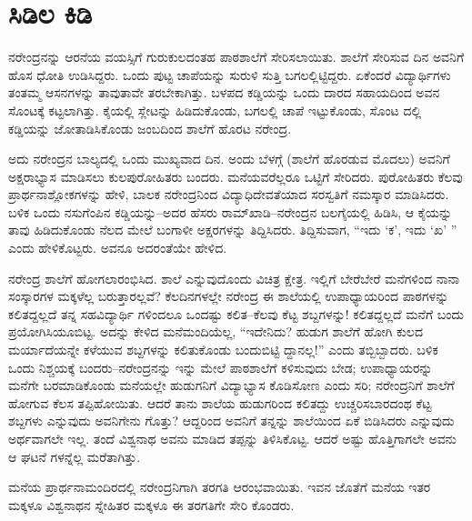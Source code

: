 
\chapter{ಸಿಡಿಲ ಕಿಡಿ}

\noindent

ನರೇಂದ್ರನನ್ನು ಆರನೆಯ ವಯಸ್ಸಿಗೆ ಗುರುಕುಲದಂತಹ ಪಾಠಶಾಲೆಗೆ ಸೇರಿಸಲಾಯಿತು. ಶಾಲೆಗೆ ಸೇರಿಸುವ ದಿನ ಅವನಿಗೆ ಹೊಸ ಧೋತಿ ಉಡಿಸಿದ್ದರು. ಒಂದು ಪುಟ್ಟ ಚಾಪೆಯನ್ನು ಸುರುಳಿ ಸುತ್ತಿ ಬಗಲಲ್ಲಿಟ್ಟಿದ್ದರು. ಏಕೆಂದರೆ ವಿದ್ಯಾರ್ಥಿಗಳು ತಂತಮ್ಮ ಆಸನಗಳನ್ನು ತಾವುತಾವೇ ತರಬೇಕಾಗಿತ್ತು. ಬಳಪದ ಕಡ್ಡಿಯನ್ನು ಒಂದು ದಾರದ ಸಹಾಯದಿಂದ ಅವನ ಸೊಂಟಕ್ಕೆ ಕಟ್ಟಲಾಗಿತ್ತು. ಕೈಯಲ್ಲಿ ಸ್ಲೇಟನ್ನು ಹಿಡಿದುಕೊಂಡು, ಬಗಲಲ್ಲಿ ಚಾಪೆ ಇಟ್ಟುಕೊಂಡು, ಸೊಂಟ ದಲ್ಲಿ ಕಡ್ಡಿಯನ್ನು ಜೋತಾಡಿಸಿಕೊಂಡು ಜಂಬದಿಂದ ಶಾಲೆಗೆ ಹೊರಟ ನರೇಂದ್ರ.

ಅದು ನರೇಂದ್ರನ ಬಾಲ್ಯದಲ್ಲಿ ಒಂದು ಮುಖ್ಯವಾದ ದಿನ. ಅಂದು ಬೆಳಗ್ಗೆ (ಶಾಲೆಗೆ ಹೊರಡುವ ಮೊದಲು) ಅವನಿಗೆ ಅಕ್ಷರಾಭ್ಯಾಸ ಮಾಡಿಸಲು ಕುಲಪುರೋಹಿತರು ಬಂದರು. ಮನೆಯವರೆಲ್ಲರೂ ಒಟ್ಟಿಗೆ ಸೇರಿದರು. ಪುರೋಹಿತರು ಕೆಲವು ಪ್ರಾರ್ಥನಾಶ್ಲೋಕಗಳನ್ನು ಹೇಳಿ, ಬಾಲಕ ನರೇಂದ್ರನಿಂದ ವಿದ್ಯಾಧಿದೇವತೆಯಾದ ಸರಸ್ವತಿಗೆ ನಮಸ್ಕಾರ ಮಾಡಿಸಿದರು. ಬಳಿಕ ಒಂದು ನಸುಗೆಂಪಿನ ಕಡ್ಡಿಯನ್ನು–ಅದರ ಹೆಸರು ರಾಮ್​ಖಾಡಿ–ನರೇಂದ್ರನ ಬಲಗೈಯಲ್ಲಿ ಹಿಡಿಸಿ, ಆ ಕೈಯನ್ನು ತಾವು ಹಿಡಿದುಕೊಂಡು ನೆಲದ ಮೇಲೆ ಬಂಗಾಳೀ ಅಕ್ಷರಗಳನ್ನು ತಿದ್ದಿಸಿದರು. ತಿದ್ದಿಸುವಾಗ, “ಇದು ‘ಕ’, ಇದು ‘ಖ’ ” ಎಂದು ಹೇಳಿಕೊಟ್ಟರು. ಅವನೂ ಅದರಂತೆಯೇ ಹೇಳಿದ.

ನರೇಂದ್ರ ಶಾಲೆಗೆ ಹೋಗಲಾರಂಭಿಸಿದ. ಶಾಲೆ ಎನ್ನುವುದೊಂದು ವಿಚಿತ್ರ ಕ್ಷೇತ್ರ. ಇಲ್ಲಿಗೆ ಬೇರೆಬೇರೆ ಮನೆಗಳಿಂದ ನಾನಾ ಸಂಸ್ಕಾರಗಳ ಮಕ್ಕಳೆಲ್ಲ ಬರುತ್ತಾರಲ್ಲವೆ? ಕೆಲದಿನಗಳಲ್ಲೇ ನರೇಂದ್ರ ಈ ಶಾಲೆಯಲ್ಲಿ ಉಪಾಧ್ಯಾಯರಿಂದ ಪಾಠಗಳನ್ನು ಕಲಿತದ್ದಲ್ಲದೆ ತನ್ನ ಸಹವಿದ್ಯಾರ್ಥಿ ಗಳಿಂದಲೂ ಒಂದಷ್ಟು ಕಲಿತ–ಕೆಲವು ಕೆಟ್ಟ ಶಬ್ದಗಳನ್ನು! ಕಲಿತದ್ದಲ್ಲದೆ ಮನೆಗೆ ಬಂದು ಪ್ರಯೋಗಿಸಿಯೂಬಿಟ್ಟ. ಅದನ್ನು ಕೇಳಿದ ಮನೆಮಂದಿಯೆಲ್ಲ, “ಇದೇನಿದು? ಹುಡುಗ ಶಾಲೆಗೆ ಹೋಗಿ ಕುಲದ ಮರ್ಯಾದೆಯನ್ನೇ ಕಳೆಯುವ ಶಬ್ದಗಳನ್ನು ಕಲಿತುಕೊಂಡು ಬಂದುಬಿಟ್ಟಿ ದ್ದಾನಲ್ಲ!” ಎಂದು ತಬ್ಬಿಬ್ಬಾದರು. ಬಳಿಕ ಒಂದು ನಿಶ್ಚಯಕ್ಕೆ ಬಂದರು–ನರೇಂದ್ರನನ್ನು ಇನ್ನು ಮೇಲೆ ಪಾಠಶಾಲೆಗೆ ಕಳಿಸುವುದು ಬೇಡ; ಉಪಾಧ್ಯಾಯರನ್ನು ಮನೆಗೇ ಬರಮಾಡಿಕೊಂಡು ಮನೆಯಲ್ಲೇ ಹುಡುಗನಿಗೆ ವಿದ್ಯಾಭ್ಯಾಸ ಕೊಡಿಸೋಣ ಎಂದು ಸರಿ; ನರೇಂದ್ರನಿಗೆ ಶಾಲೆಗೆ ಹೋಗುವ ಕೆಲಸ ತಪ್ಪಿಹೋಯಿತು. ಆದರೆ ತಾನು ಶಾಲೆಯ ಹುಡುಗರಿಂದ ಕಲಿತದ್ದು ಉಚ್ಚರಿಸಬಾರದಂಥ ಕೆಟ್ಟ ಶಬ್ದಗಳು ಎನ್ನುವುದು ಅವನಿಗೇನು ಗೊತ್ತು? ಆದ್ದರಿಂದ ಅವನಿಗೆ ತನ್ನನ್ನು ಶಾಲೆಯಿಂದ ಏಕೆ ಬಿಡಿಸಿದರು ಎನ್ನುವುದು ಅರ್ಥವಾಗಲೇ ಇಲ್ಲ. ತಂದೆ ವಿಶ್ವನಾಥ ಅವನು ಮಾಡಿದ ತಪ್ಪನ್ನು ತಿಳಿಸಿಕೊಟ್ಟ. ಆದರೆ ಅಷ್ಟು ಹೊತ್ತಿಗಾಗಲೇ ಅವನು ಆ ಘಟನೆ ಗಳನ್ನೆಲ್ಲ ಮರೆತಾಗಿತ್ತು.

ಮನೆಯ ಪ್ರಾರ್ಥನಾಮಂದಿರದಲ್ಲಿ ನರೇಂದ್ರನಿಗಾಗಿ ತರಗತಿ ಆರಂಭವಾಯಿತು. ಇವನ ಜೊತೆಗೆ ಮನೆಯ ಇತರ ಮಕ್ಕಳೂ ವಿಶ್ವನಾಥನ ಸ್ನೇಹಿತರ ಮಕ್ಕಳೂ ಈ ತರಗತಿಗೇ ಸೇರಿ ಕೊಂಡರು.

